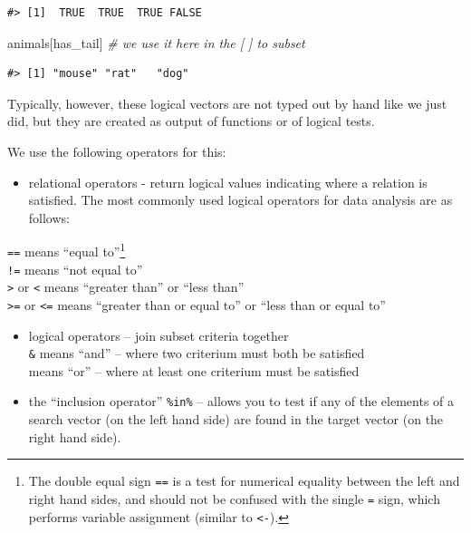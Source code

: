 \documentclass[
]{book}
\newenvironment{Shaded}{\begin{snugshade}}{\end{snugshade}}
\newcommand{\CommentTok}[1]{\textcolor[rgb]{0.56,0.35,0.01}{\textit{#1}}}
\newcommand{\NormalTok}[1]{#1}
\providecommand{\tightlist}{%
  \setlength{\itemsep}{0pt}\setlength{\parskip}{0pt}}
\begin{document}
\begin{verbatim}
#> [1]  TRUE  TRUE  TRUE FALSE
\end{verbatim}

\begin{Shaded}
\begin{Highlighting}[]
\NormalTok{animals[has\_tail] }\CommentTok{\# we use it here in the [ ] to subset}
\end{Highlighting}
\end{Shaded}

\begin{verbatim}
#> [1] "mouse" "rat"   "dog"
\end{verbatim}

Typically, however, these logical vectors are not typed out by hand like we just did, but they are created as output of functions or of logical tests.

We use the following operators for this:

\begin{itemize}
\tightlist
\item
  relational operators - return logical values indicating where a relation is satisfied. The most commonly used logical operators for data analysis are as follows:
\end{itemize}

\texttt{==} means ``equal to''\footnote{The double equal sign \texttt{==} is a test for numerical equality between the left and right hand sides, and should not be confused with the single \texttt{=} sign, which performs variable assignment (similar
  to \texttt{\textless{}-}).}\\
\texttt{!=} means ``not equal to''\\
\texttt{\textgreater{}} or \texttt{\textless{}} means ``greater than'' or ``less than''\\
\texttt{\textgreater{}=} or \texttt{\textless{}=} means ``greater than or equal to'' or ``less than or equal to''

\begin{itemize}
\item
  logical operators -- join subset criteria together\\
  \texttt{\&} means ``and'' -- where two criterium must both be satisfied\\
  \texttt{\textbar{}} means ``or'' -- where at least one criterium must be satisfied
\item
  the ``inclusion operator'' \texttt{\%in\%} -- allows you to test if any of the elements of a search vector (on the left hand side) are found in the target vector (on the right hand side).
\end{itemize}
\end{document}
